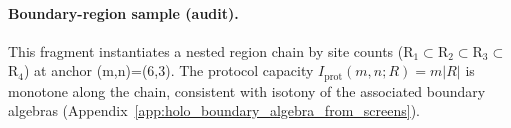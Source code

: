 \paragraph{Boundary-region sample (audit).} \AuditTag This fragment instantiates a nested region chain by site counts (R$_1\subset$R$_2\subset$R$_3\subset$R$_4$) at anchor (m,n)=(6,3). The protocol capacity $I_{\mathrm{prot}}(m,n;R)=m|R|$ is monotone along the chain, consistent with isotony of the associated boundary algebras (Appendix~\ref{app:holo_boundary_algebra_from_screens}).